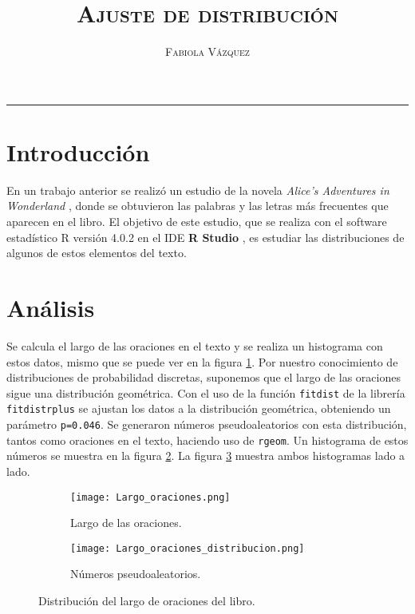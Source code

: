 \documentclass[12pt,letterpaper]{article}
\title{\textsc{Ajuste de distribución}}
\author{\textsc{Fabiola Vázquez}}
\begin{document}
\maketitle

\hrule
\section{Introducción}
En un trabajo anterior \cite{fabiola} se realizó un estudio de la novela \textit{Alice's Adventures in Wonderland} \cite{alice}, donde se obtuvieron las palabras y las letras más frecuentes que aparecen en el libro. El objetivo de este estudio, que se realiza con el software estadístico R versión 4.0.2 \cite{R} en el IDE \textbf{R Studio} \cite{rstudio}, es estudiar las distribuciones de algunos de estos elementos del texto.

\section{Análisis}
Se calcula el largo de las oraciones en el texto y se realiza un histograma con estos datos, mismo que se puede ver en la figura \ref{historaciones}. Por nuestro conocimiento de distribuciones de probabilidad discretas, suponemos que el largo de las oraciones sigue una distribución geométrica. Con el uso de la función \texttt{fitdist} de la librería \texttt{fitdistrplus} se ajustan los datos a la distribución geométrica, obteniendo un parámetro \texttt{p=0.046}. Se generaron números pseudoaleatorios con esta distribución, tantos como oraciones en el texto, haciendo uso de \texttt{rgeom}. Un histograma de estos números se muestra en la figura \ref{historacionesrandom}.  La figura \ref{oraciones} muestra ambos histogramas lado a lado.

\begin{figure}
 	\centering 
 	\begin{subfigure}[b]{0.45\linewidth}
 		\texttt{[image: Largo\_oraciones.png]} 		
 		\caption{Largo de las oraciones.}
 		 		\label{historaciones}
 	\end{subfigure}
 	\begin{subfigure}[b]{0.45\linewidth}
 		\texttt{[image: Largo\_oraciones\_distribucion.png]} 		
 		\caption{Números pseudoaleatorios.}
 		\label{historacionesrandom}
 	\end{subfigure}

 	 	\caption{Distribución del largo de oraciones del libro.} 
 	 		\label{oraciones}
\end{figure}
\end{document}
